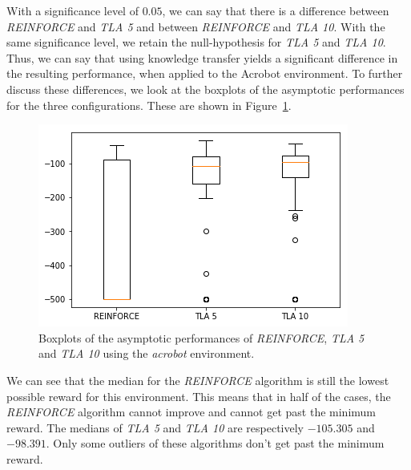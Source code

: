 With a significance level of $0.05$, we can say that there is a difference between \textit{REINFORCE} and \textit{TLA 5} and between \textit{REINFORCE} and \textit{TLA 10}.
With the same significance level, we retain the null-hypothesis for \textit{TLA 5} and \textit{TLA 10}.
Thus, we can say that using knowledge transfer yields a significant difference in the resulting performance, when applied to the Acrobot environment.
To further discuss these differences, we look at the boxplots of the asymptotic performances for the three configurations. These are shown in Figure~\ref{fig:Acrobot:asymp_target_re-akt5-akt10}.
\begin{figure}[htb]
    \centering
    \includegraphics[width=.8\linewidth]{images/results/Acrobot/no_sparse_transfer/asymp_target_re-akt5-akt10.png}
    \caption{Boxplots of the asymptotic performances of \textit{REINFORCE}, \textit{TLA 5} and \textit{TLA 10} using the \textit{acrobot} environment.}
    \label{fig:Acrobot:asymp_target_re-akt5-akt10}
\end{figure}
We can see that the median for the \textit{REINFORCE} algorithm is still the lowest possible reward for this environment. This means that in half of the cases, the \textit{REINFORCE} algorithm cannot improve and cannot get past the minimum reward. The medians of \textit{TLA 5} and \textit{TLA 10} are respectively $-105.305$ and $-98.391$. Only some outliers of these algorithms don't get past the minimum reward.


